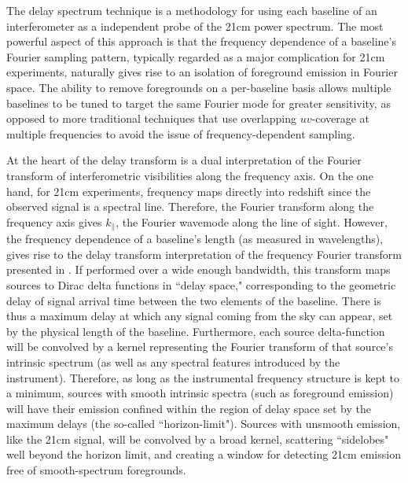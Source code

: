 \documentclass[10pt,iop]{emulateapj}
\begin{document}
The delay spectrum technique is a methodology for using each baseline of
an interferometer as a independent probe of the 21cm power spectrum.  The most powerful
aspect of this approach is that the frequency dependence of a baseline's Fourier
sampling pattern, typically regarded as a major complication for 21cm experiments,
naturally gives rise to an isolation of foreground emission in Fourier space.  The ability
to remove foregrounds on a per-baseline basis allows multiple baselines to be tuned to
target the same Fourier mode for greater sensitivity, as opposed to more traditional
techniques that use overlapping $uv$-coverage at multiple frequencies to avoid the issue
of frequency-dependent sampling.

At the heart of the delay transform is a dual interpretation of the Fourier transform
of interferometric visibilities along the frequency axis.  On the one hand, for 21cm
experiments, frequency maps directly into redshift since the observed signal is a spectral
line.  Therefore, the Fourier transform along the frequency axis gives $k_{\parallel}$, the
Fourier wavemode along the line of sight.  However, the frequency dependence of a baseline's
length (as measured in wavelengths), gives rise to the delay transform interpretation of the
frequency Fourier transform presented in \citet{parsons_and_backer_2009}.  
If performed over a wide enough bandwidth, this transform
maps sources to Dirac delta functions in ``delay space," corresponding to the geometric
delay of signal arrival time between the two elements of the baseline.  There is thus
a maximum delay at which any signal coming from the sky can appear, set by the physical
length of the baseline.  Furthermore, each source delta-function will be convolved
by a kernel representing the Fourier transform of that source's intrinsic spectrum (as
well as any spectral features introduced by the instrument).  Therefore, as long as the
instrumental frequency structure is kept to a minimum, sources with smooth intrinsic
spectra (such as foreground emission) will have their emission confined within the
region of delay space set by the maximum delays (the so-called ``horizon-limit").  
Sources with unsmooth emission,
like the 21cm signal, will be convolved by a broad kernel, scattering ``sidelobes"
well beyond the horizon limit, and creating a window for detecting 21cm emission free of
smooth-spectrum foregrounds.  
\end{document}
